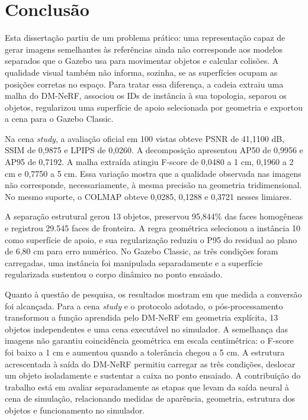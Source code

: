 \chapter{Conclusão}\label{cap:conclusao}

Esta dissertação partiu de um problema prático: uma representação capaz de gerar imagens semelhantes às referências ainda não corresponde aos modelos separados que o Gazebo usa para movimentar objetos e calcular colisões. A qualidade visual também não informa, sozinha, se as superfícies ocupam as posições corretas no espaço. Para tratar essa diferença, a cadeia extraiu uma malha do DM-NeRF, associou os IDs de instância à sua topologia, separou os objetos, regularizou uma superfície de apoio selecionada por geometria e exportou a cena para o Gazebo Classic.

Na cena \textit{study}, a avaliação oficial em 100 vistas obteve PSNR de 41,1100 dB, SSIM de 0,9875 e LPIPS de 0,0260. A decomposição apresentou AP50 de 0,9956 e AP95 de 0,7192. A malha extraída atingiu F-score de 0,0480 a 1 cm, 0,1960 a 2 cm e 0,7750 a 5 cm. Essa variação mostra que a qualidade observada nas imagens não corresponde, necessariamente, à mesma precisão na geometria tridimensional. No mesmo suporte, o COLMAP obteve 0,0285, 0,1288 e 0,3721 nesses limiares.

A separação estrutural gerou 13 objetos, preservou 95,844\% das faces homogêneas e registrou 29.545 faces de fronteira. A regra geométrica selecionou a instância 10 como superfície de apoio, e sua regularização reduziu o P95 do residual ao plano de 6,80 cm para erro numérico. No Gazebo Classic, as três condições foram carregadas, uma instância foi manipulada separadamente e a superfície regularizada sustentou o corpo dinâmico no ponto ensaiado.

Quanto à questão de pesquisa, os resultados mostram em que medida a conversão foi alcançada. Para a cena \textit{study} e o protocolo adotado, o pós-processamento transformou a função aprendida pelo DM-NeRF em geometria explícita, 13 objetos independentes e uma cena executável no simulador. A semelhança das imagens não garantiu coincidência geométrica em escala centimétrica: o F-score foi baixo a 1 cm e aumentou quando a tolerância chegou a 5 cm. A estrutura acrescentada à saída do DM-NeRF permitiu carregar as três condições, deslocar um objeto isoladamente e sustentar a caixa no ponto ensaiado. A contribuição do trabalho está em avaliar separadamente as etapas que levam da saída neural à cena de simulação, relacionando medidas de aparência, geometria, estrutura dos objetos e funcionamento no simulador.
